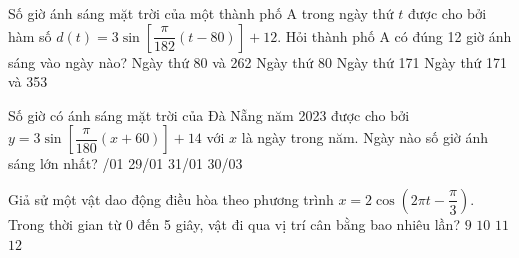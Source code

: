 \begin{ex}
    Số giờ ánh sáng mặt trời của một thành phố A trong ngày thứ $t$ được cho bởi hàm số $d(t) = 3\sin \left[\dfrac{\pi}{182}(t - 80)\right] + 12$. Hỏi thành phố A có đúng 12 giờ ánh sáng vào ngày nào?
    \choice
    {\True Ngày thứ 80 và 262}
    {Ngày thứ 80}
    {Ngày thứ 171}
    {Ngày thứ 171 và 353}
\end{ex}
\begin{ex}
    Số giờ có ánh sáng mặt trời của Đà Nẵng năm 2023 được cho bởi $y = 3\sin \left[\dfrac{\pi}{180}(x + 60)\right] + 14$ với $x$ là ngày trong năm. Ngày nào số giờ ánh sáng lớn nhất?
    \choice
    {/01}
    {29/01}
    {31/01}
    {30/03}
\end{ex}
\begin{ex}
    Giả sử một vật dao động điều hòa theo phương trình $x = 2\cos \left(2\pi t - \dfrac{\pi}{3}\right)$. Trong thời gian từ 0 đến 5 giây, vật đi qua vị trí cân bằng bao nhiêu lần?
    \choice
    {$9$}
    {\True $10$}
    {$11$}
    {$12$}
\end{ex}
